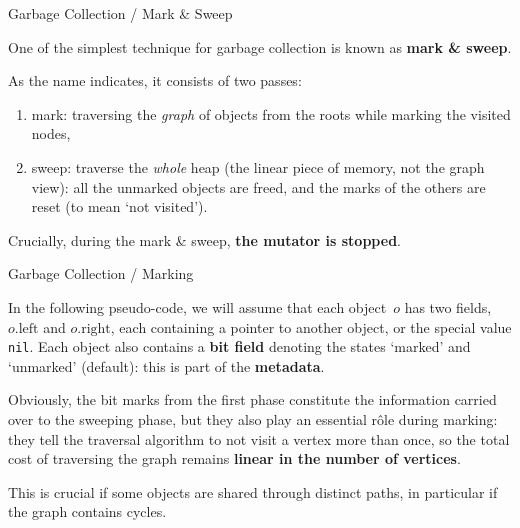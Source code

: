 \documentclass[compress,dvipdfmx]{beamer}
\begin{document}
%
\begin{frame}{Garbage Collection / Mark \& Sweep}

  One of the simplest technique for garbage collection is known as
  \textbf{mark \& sweep}.

  \bigskip

  As the name indicates, it consists of two passes:
  \begin{enumerate}

    \item mark: traversing the \emph{graph} of objects from the roots
      while marking the visited nodes,

    \item sweep: traverse the \emph{whole} heap (the linear piece of
      memory, not the graph view): all the unmarked objects are freed,
      and the marks of the others are reset (to mean `not visited').

  \end{enumerate}
  Crucially, during the mark \& sweep, \textbf{the mutator is
    stopped}.

\end{frame}

%
\begin{frame}{Garbage Collection / Marking}

  In the following pseudo\hyp{}code, we will assume that each
  object~\(o\) has two fields, \(o.\text{left}\) and
  \(o.\text{right}\), each containing a pointer to another object, or
  the special value \texttt{nil}. Each object also contains a
  \textbf{bit field} denoting the states `marked' and `unmarked'
  (default): this is part of the \textbf{metadata}.

  \bigskip

  Obviously, the bit marks from the first phase constitute the
  information carried over to the sweeping phase, but they also play
  an essential rôle during marking: they tell the traversal algorithm
  to not visit a vertex more than once, so the total cost of
  traversing the graph remains \textbf{linear in the number of
    vertices}.

  \bigskip

  This is crucial if some objects are shared through distinct paths,
  in particular if the graph contains cycles.

\end{frame}
\end{document}

